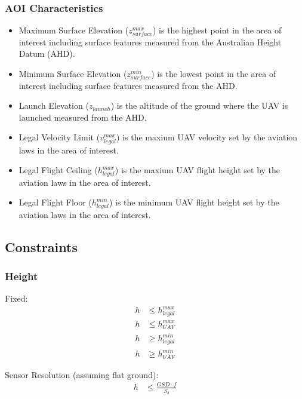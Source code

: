 \documentclass[11pt]{article}
\begin{document}
\subsubsection{AOI Characteristics}

\begin{itemize}
    \item Maximum Surface Elevation ($z_{surface}^{max}$) is the highest point in the area of interest including surface features measured from the Australian Height Datum (AHD).
    \item Minimum Surface Elevation ($z_{surface}^{min}$) is the lowest point in the area of interest including surface features measured from the AHD.
    \item Launch Elevation ($z_{launch}$) is the altitude of the ground where the UAV is launched measured from the AHD. 
    \item Legal Velocity Limit ($v_{legal}^{max}$) is the maxium UAV velocity set by the aviation laws in the area of interest. 
    \item Legal Flight Ceiling ($h_{legal}^{max}$) is the maxium UAV flight height set by the aviation laws in the area of interest. 
    \item Legal Flight Floor ($h_{legal}^{min}$) is the minimum UAV flight height set by the aviation laws in the area of interest. 
\end{itemize}
\newpage
\subsection{Constraints}

\subsubsection{Height}

Fixed:
\begin{align}
    h &\leq h_{legal}^{max} \label{eq:ConHeightLegal} \\
    h &\leq h_{UAV}^{max}\label{eq:ConHeightUAVmax} \\ 
    h &\geq h_{legal}^{min} \label{eq:ConHeightLegalmin}\\ 
    h &\geq h_{UAV}^{min} \label{eq:ConHeightUAVmin}
\end{align}

Sensor Resolution (assuming flat ground):
\begin{align}
    h &\leq \frac{GSD \cdot f}{S_\delta} \label{eq:ConHeightPixRes}
\end{align}
\end{document}

